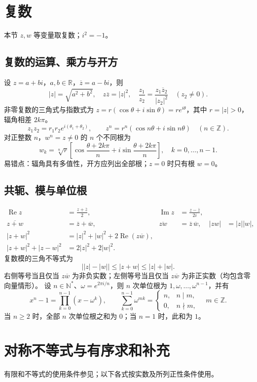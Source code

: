 \documentclass[../main.tex]{subfiles}
\begin{document}
\section{复数}
本节 $z,w$ 等变量取复数；$i^2=-1$。
\subsection{复数的运算、乘方与开方}
设 $z=a+bi$，$a,b\in\mathbb R$，$\overline z=a-bi$，则
\[
|z|=\sqrt{a^2+b^2},\quad z\overline z=|z|^2,\quad
\frac{z_1}{z_2}=\frac{z_1\overline z_2}{|z_2|^2}\quad(z_2\ne0).
\]
非零复数的三角式与指数式为 $z=r(\cos\theta+i\sin\theta)=re^{i\theta}$，其中 $r=|z|>0$，辐角相差 $2k\pi$。
\[
z_1z_2=r_1r_2e^{i(\theta_1+\theta_2)},\qquad
z^n=r^n(\cos n\theta+i\sin n\theta)\quad(n\in\mathbb Z).
\]
对正整数 $n$，$w^n=z\ne0$ 的 $n$ 个不同根为
\[
w_k=\sqrt[n]r\left[\cos\frac{\theta+2k\pi}{n}
+i\sin\frac{\theta+2k\pi}{n}\right],\quad k=0,\ldots,n-1.
\]
易错点：辐角具有多值性，开方应列出全部根；$z=0$ 时只有根 $w=0$。
\subsection{共轭、模与单位根}
\begin{align*}
\operatorname{Re}z&=\frac{z+\overline z}{2}, &
\operatorname{Im}z&=\frac{z-\overline z}{2i},\\
\overline{z+w}&=\overline z+\overline w, &
\overline{zw}&=\overline z\,\overline w, & |zw|&=|z||w|,\\
|z+w|^2&=|z|^2+|w|^2+2\operatorname{Re}(z\overline w),\\
|z+w|^2+|z-w|^2&=2|z|^2+2|w|^2.
\end{align*}
复数模的三角不等式为
\[
\bigl||z|-|w|\bigr|\le|z+w|\le|z|+|w|.
\]
右侧等号当且仅当 $z\overline w$ 为非负实数；左侧等号当且仅当 $z\overline w$ 为非正实数（均包含零向量情形）。
设 $n\in\mathbb N^*$、$\omega=e^{2\pi i/n}$，则 $n$ 次单位根为 $1,\omega,\ldots,\omega^{n-1}$，并有
\[
x^n-1=\prod_{k=0}^{n-1}(x-\omega^k),\qquad
\sum_{k=0}^{n-1}\omega^{mk}=
\begin{cases}n,&n\mid m,\\0,&n\nmid m,\end{cases}\quad m\in\mathbb Z.
\]
当 $n\ge2$ 时，全部 $n$ 次单位根之和为 $0$；当 $n=1$ 时，此和为 $1$。
\section{对称不等式与有序求和补充}
有限和不等式的使用条件参见\cite{hlp}；以下各式按实数及所列正性条件使用。
\end{document}
